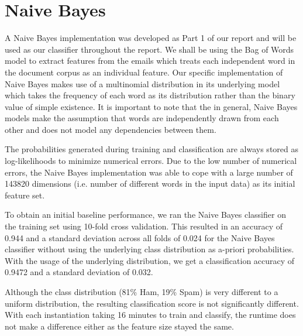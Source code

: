 \section{Naive Bayes}
A Naive Bayes implementation was developed as Part 1 of our report and will be used as our classifier throughout the report.
We shall be using the Bag of Words model to extract features from the emails which treats each independent word in the document corpus as an individual feature.
Our specific implementation of Naive Bayes makes use of a multinomial distribution in its underlying model which takes the frequency of each word as its distribution rather than the binary value of simple existence.
It is important to note that the in general, Naive Bayes models make the assumption that words are independently drawn from each other and does not model any dependencies between them.

The probabilities generated during training and classification are always stored as log-likelihoods to minimize numerical errors.
Due to the low number of numerical errors, the Naive Bayes implementation was able to cope with a large number of 143820 dimensions (i.e. number of different words in the input data) as its initial feature set.

To obtain an initial baseline performance, we ran the Naive Bayes classifier on the training set using 10-fold cross validation.
This resulted in an accuracy of 0.944 and a standard deviation across all folds of 0.024 for the Naive Bayes classifier without using the underlying class distribution as a-priori probabilities.
With the usage of the underlying distribution, we get a classification accuracy of 0.9472 and a standard deviation of 0.032.

Although the class distribution (81\% Ham, 19\% Spam) is very different to a uniform distribution, the resulting classification score is not significantly different.
With each instantiation taking 16 minutes to train and classify, the runtime does not make a difference either as the feature size stayed the same.

